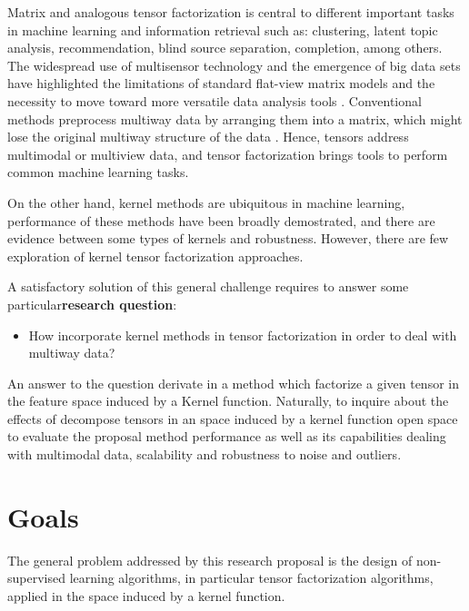 \documentclass[letterpaper,12pt]{article}
\begin{document}
Matrix and analogous tensor factorization is central to different important tasks in machine learning and information retrieval such as: clustering, latent topic analysis, recommendation, blind source separation, completion, among others.  The widespread use of multisensor technology and the emergence of big data sets have highlighted the limitations of standard flat-view matrix models and the necessity to move toward more versatile data analysis tools \cite{Cichocki2015}. Conventional methods preprocess multiway data by arranging them into a matrix, which might lose the original multiway structure of the data  \cite{Wang2013}. Hence, tensors address multimodal or multiview data, and tensor factorization brings tools to perform common machine learning tasks.

On the other hand, kernel methods are ubiquitous in machine learning, performance of these methods have been broadly demostrated, and there are evidence between some types of kernels and robustness. However, there are few exploration of kernel tensor factorization approaches.

A satisfactory solution of this general challenge requires to answer some particular\textbf{research question}: 

\begin{itemize}
 \item How incorporate kernel methods in tensor factorization in order to deal with multiway data? %
\end{itemize}

An answer to the question derivate in a method which factorize a given tensor in the feature space induced by a Kernel function. Naturally, to inquire about the effects of decompose tensors in an space induced by a kernel function open space to evaluate the proposal method performance as well as its capabilities dealing with multimodal data, scalability and robustness to noise and outliers.




\section{Goals}

The general problem addressed by this research proposal is the design of non-supervised learning algorithms, in particular tensor factorization algorithms, applied in the space induced by a kernel function. 
\end{document}

